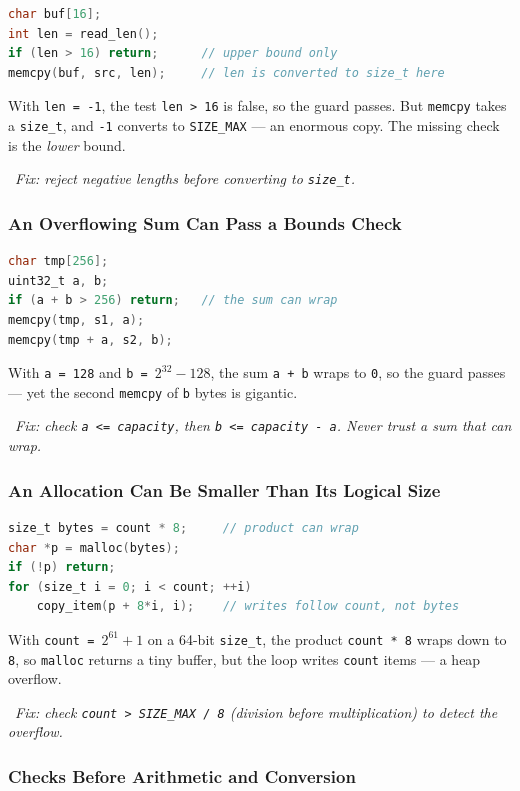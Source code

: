 \documentclass[hidelinks]{article}
\newcommand{\callout}[1]{\par\smallskip\noindent{\color{capri}$\blacktriangleright$}\ \textit{#1}\par\smallskip}
\begin{document}
\begin{lstlisting}[language=C]
char buf[16];
int len = read_len();
if (len > 16) return;      // upper bound only
memcpy(buf, src, len);     // len is converted to size_t here
\end{lstlisting}
With \texttt{len = -1}, the test \texttt{len > 16} is false, so the guard passes. But \texttt{memcpy} takes a \texttt{size\_t}, and \texttt{-1} converts to \texttt{SIZE\_MAX} --- an enormous copy. The missing check is the \emph{lower} bound.

\callout{Fix: reject negative lengths \emph{before} converting to \texttt{size\_t}.}

\subsubsection{An Overflowing Sum Can Pass a Bounds Check}

\begin{lstlisting}[language=C]
char tmp[256];
uint32_t a, b;
if (a + b > 256) return;   // the sum can wrap
memcpy(tmp, s1, a);
memcpy(tmp + a, s2, b);
\end{lstlisting}
With \texttt{a = 128} and \texttt{b = $2^{32}-128$}, the sum \texttt{a + b} wraps to \texttt{0}, so the guard passes --- yet the second \texttt{memcpy} of \texttt{b} bytes is gigantic.

\callout{Fix: check \texttt{a <= capacity}, then \texttt{b <= capacity - a}. Never trust a sum that can wrap.}

\subsubsection{An Allocation Can Be Smaller Than Its Logical Size}

\begin{lstlisting}[language=C]
size_t bytes = count * 8;     // product can wrap
char *p = malloc(bytes);
if (!p) return;
for (size_t i = 0; i < count; ++i)
    copy_item(p + 8*i, i);    // writes follow count, not bytes
\end{lstlisting}
With \texttt{count = $2^{61}+1$} on a 64-bit \texttt{size\_t}, the product \texttt{count * 8} wraps down to \texttt{8}, so \texttt{malloc} returns a tiny buffer, but the loop writes \texttt{count} items --- a heap overflow.

\callout{Fix: check \texttt{count > SIZE\_MAX / 8} (division \emph{before} multiplication) to detect the overflow.}

\subsubsection{Checks Before Arithmetic and Conversion}
\end{document}
